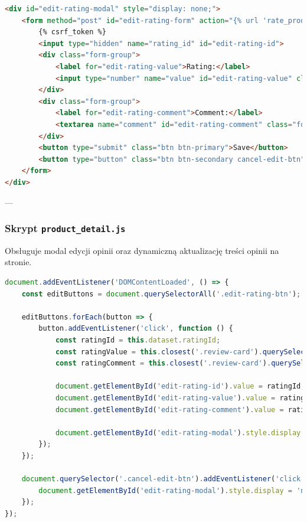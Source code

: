 \documentclass[12pt,a4paper,oneside]{article}
\theoremstyle{definition}
\numberwithin{equation}{section}
\begin{document}
\begin{lstlisting}[language=HTML, caption=Fragment \texttt{product\_detail.html}]
<div id="edit-rating-modal" style="display: none;">
    <form method="post" id="edit-rating-form" action="{% url 'rate_product' product.id %}" data-product-id="{{ product.id }}">
        {% csrf_token %}
        <input type="hidden" name="rating_id" id="edit-rating-id">
        <div class="form-group">
            <label for="edit-rating-value">Rating:</label>
            <input type="number" name="value" id="edit-rating-value" class="form-control" min="1" max="5" required>
        </div>
        <div class="form-group">
            <label for="edit-rating-comment">Comment:</label>
            <textarea name="comment" id="edit-rating-comment" class="form-control"></textarea>
        </div>
        <button type="submit" class="btn btn-primary">Save</button>
        <button type="button" class="btn btn-secondary cancel-edit-btn">Cancel</button>
    </form>
</div>
\end{lstlisting}

---

\subsubsection{Skrypt \texttt{product\_detail.js}}
Obsługuje modal edycji opinii oraz dynamiczną aktualizację treści opinii na stronie.

\begin{lstlisting}[language=JavaScript, caption=Fragment \texttt{product\_detail.js}]
document.addEventListener('DOMContentLoaded', () => {
    const editButtons = document.querySelectorAll('.edit-rating-btn');

    editButtons.forEach(button => {
        button.addEventListener('click', function () {
            const ratingId = this.dataset.ratingId;
            const ratingValue = this.closest('.review-card').querySelectorAll('.bi-star-fill').length;
            const ratingComment = this.closest('.review-card').querySelector('.review-comment').innerText;

            document.getElementById('edit-rating-id').value = ratingId;
            document.getElementById('edit-rating-value').value = ratingValue;
            document.getElementById('edit-rating-comment').value = ratingComment;

            document.getElementById('edit-rating-modal').style.display = 'block';
        });
    });

    document.querySelector('.cancel-edit-btn').addEventListener('click', () => {
        document.getElementById('edit-rating-modal').style.display = 'none';
    });
});
\end{lstlisting}
\end{document}
